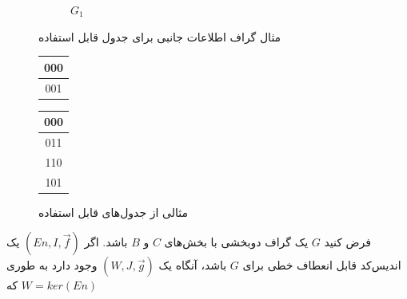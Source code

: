 \begin{example}
\begin{figure}[H]
\begin{subfigure}[b]{0.3\textwidth}
    \caption{$G_1$}
       \label{figure:example:shit}
            \end{subfigure}
                    \caption{مثال گراف اطلاعات جانبی برای جدول قابل استفاده}
            \label{fig:three graphs}
       	\end{figure}
       	
       	\begin{figure}[H]
       		    \begin{subtable}[h]{0.45\textwidth}
       			\centering
	        		\begin{tabular}{|c|}
	        			\hline
	        			000 \\
	        			\hline
	        			001 \\
	        			\hline
	        		\end{tabular}
	        		\caption{$T_1$}
	        		\end{subtable}
	        		       		    \begin{subtable}[h]{0.45\textwidth}
	        			\centering
	 		       		\begin{tabular}{|c|}
	 		       			\hline
	 		       			000  \\
	 		       			\hline
	 		       			011   \\
	 		       			\hline
	 		       			110  \\
	 		       			\hline
	 		       			101   \\
	 		       			\hline
	 		       		\end{tabular}
	 		       	\caption{$T_2$}
       	       \label{figure:example:shittable}
       	       	        		\end{subtable}
       	       	        		\caption{مثالی از جدول‌های قابل استفاده}
      	\end{figure}
\end{example}

\begin{lemma}
    فرض کنید 
    $G$ 
    یک گراف دوبخشی با بخش‌های
    $C$
    و
    $B$
     باشد. اگر 
    $(En, I, \overrightarrow{f})$
    یک اندیس‌کد قابل انعطاف خطی برای 
    $G$
     باشد، آنگاه یک 
     \lpsicod
      $(W, J, \overrightarrow{g})$
     وجود دارد به طوری که 
     $W  = ker(En)$
\end{lemma}

